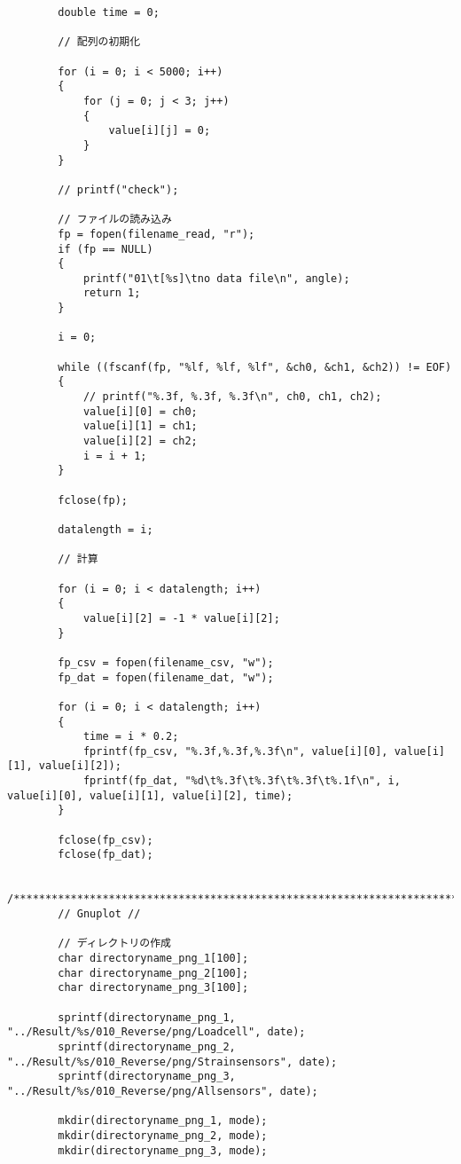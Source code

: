 \documentclass[12pt,a4paper]{jsarticle}
\begin{document}
{\begin{lstlisting}
        double time = 0;
    
        // 配列の初期化
    
        for (i = 0; i < 5000; i++)
        {
            for (j = 0; j < 3; j++)
            {
                value[i][j] = 0;
            }
        }
    
        // printf("check");
    
        // ファイルの読み込み
        fp = fopen(filename_read, "r");
        if (fp == NULL)
        {
            printf("01\t[%s]\tno data file\n", angle);
            return 1;
        }
    
        i = 0;
    
        while ((fscanf(fp, "%lf, %lf, %lf", &ch0, &ch1, &ch2)) != EOF)
        {
            // printf("%.3f, %.3f, %.3f\n", ch0, ch1, ch2);
            value[i][0] = ch0;
            value[i][1] = ch1;
            value[i][2] = ch2;
            i = i + 1;
        }
    
        fclose(fp);
    
        datalength = i;
    
        // 計算
    
        for (i = 0; i < datalength; i++)
        {
            value[i][2] = -1 * value[i][2];
        }
    
        fp_csv = fopen(filename_csv, "w");
        fp_dat = fopen(filename_dat, "w");
    
        for (i = 0; i < datalength; i++)
        {
            time = i * 0.2;
            fprintf(fp_csv, "%.3f,%.3f,%.3f\n", value[i][0], value[i][1], value[i][2]);
            fprintf(fp_dat, "%d\t%.3f\t%.3f\t%.3f\t%.1f\n", i, value[i][0], value[i][1], value[i][2], time);
        }
    
        fclose(fp_csv);
        fclose(fp_dat);
    
        /*****************************************************************************/
        // Gnuplot //
    
        // ディレクトリの作成
        char directoryname_png_1[100];
        char directoryname_png_2[100];
        char directoryname_png_3[100];
    
        sprintf(directoryname_png_1, "../Result/%s/010_Reverse/png/Loadcell", date);
        sprintf(directoryname_png_2, "../Result/%s/010_Reverse/png/Strainsensors", date);
        sprintf(directoryname_png_3, "../Result/%s/010_Reverse/png/Allsensors", date);
    
        mkdir(directoryname_png_1, mode);
        mkdir(directoryname_png_2, mode);
        mkdir(directoryname_png_3, mode);
    

\end{lstlisting}}
\end{document}
